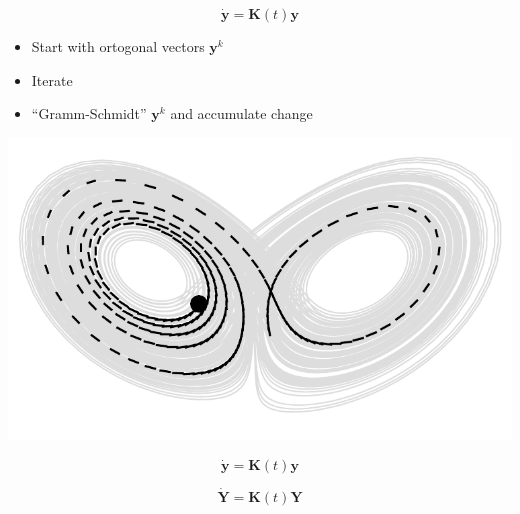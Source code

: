 \topline
\begin{equation*}
\dot{\mathbf{y}} = \mathbf{K}(t) \mathbf{y}
\end{equation*}

\begin{itemize}
\item Start with ortogonal vectors $\mathbf{y}^k$
\item Iterate
\item ``Gramm-Schmidt'' $\mathbf{y}^k$ and accumulate change
\end{itemize}
\eframe

\topline
\begin{center}
  \includegraphics[width=\textwidth]{i/wolf.pdf}
\end{center}
\eframe

\topline

\begin{equation*}
\dot{\mathbf{y}} = \mathbf{K}(t) \mathbf{y}
\end{equation*}

\begin{equation*}
\dot{\mathbf{Y}} = \mathbf{K}(t) \mathbf{Y}
\end{equation*}

\begin{equation*}

\end{equation*}

\eframe
